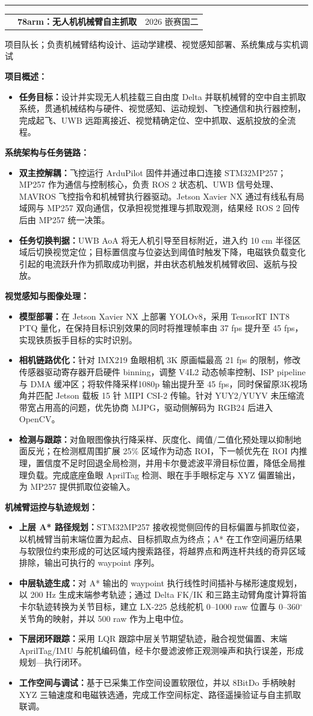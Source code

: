 \documentclass{common/resume}
\makeatletter
\newcommand{\sectionBar}[1]{%
  \vspace{0.24em}%
  \noindent\colorbox{ResumeBlue}{\makebox[2.30cm][l]{\strut\hspace{0.32em}\textcolor{white}{\bfseries\small #1}}}%
  \hspace{0.12em}\textcolor{LineGray}{\rule[0.45ex]{0.74\linewidth}{0.45pt}}%
  \vspace{0.06em}\par
}
\newcommand{\centerProjectTitle}[3]{%
  \vspace{0.12em}%
  \noindent\begin{tabularx}{\linewidth}{@{}p{3cm}>{\centering\arraybackslash\bfseries}X>{\raggedleft\arraybackslash}p{3cm}@{}}
    & #1 & {\small #2}\\[-0.10em]
  \end{tabularx}
  {\small #3}\par
  \vspace{0.00em}\par
}
\newcommand{\subHead}[1]{\vspace{0.04em}\noindent\textbf{#1：}}
\newcommand{\tightItem}[1]{\item #1}
\makeatother
\begin{document}
\sectionBar{项目经历}
\centerProjectTitle{78arm：无人机机械臂自主抓取}{2026 嵌赛国二}{项目队长；负责机械臂结构设计、运动学建模、视觉感知部署、系统集成与实机调试}
\subHead{项目概述}
\begin{itemize}
  \tightItem{\textbf{任务目标：}设计并实现无人机挂载三自由度 Delta 并联机械臂的空中自主抓取系统，贯通机械结构与硬件、视觉感知、运动规划、飞控通信和执行器控制，完成起飞、UWB 远距离接近、视觉精确定位、空中抓取、返航投放的全流程。}
\end{itemize}
\subHead{系统架构与任务链路}
\begin{itemize}
  \tightItem{\textbf{双主控解耦：}飞控运行 ArduPilot 固件并通过串口连接 STM32MP257；MP257 作为通信与控制核心，负责 ROS 2 状态机、UWB 信号处理、MAVROS 飞控指令和机械臂执行器驱动。Jetson Xavier NX 通过有线私有局域网与 MP257 双向通信，仅承担视觉推理与抓取观测，结果经 ROS 2 回传后由 MP257 统一决策。}
  \tightItem{\textbf{任务切换判据：}UWB AoA 将无人机引导至目标附近，进入约 10 cm 半径区域后切换视觉定位；目标置信度与位姿达到阈值时触发下降，电磁铁负载变化引起的电流跃升作为抓取成功判据，并由状态机触发机械臂收回、返航与投放。}
\end{itemize}
\subHead{视觉感知与图像处理}
\begin{itemize}
  \tightItem{\textbf{模型部署：}在 Jetson Xavier NX 上部署 YOLOv8，采用 TensorRT INT8 PTQ 量化，在保持目标识别效果的同时将推理帧率由 37 fps 提升至 45 fps，实现铁质扳手目标的实时识别。}
  \tightItem{\textbf{相机链路优化：}针对 IMX219 鱼眼相机 3K 原画幅最高 21 fps 的限制，修改传感器驱动寄存器开启硬件 binning，调整 V4L2 动态帧率控制、ISP pipeline 与 DMA 缓冲区；将软件降采样1080p 输出提升至 45 fps，同时保留原3K视场角并匹配 Jetson 载板 15 针 MIPI CSI-2 传输。针对 YUY2/YUYV 未压缩流带宽占用高的问题，优先协商 MJPG，驱动侧解码为 RGB24 后进入 OpenCV。}
  \tightItem{\textbf{检测与跟踪：}对鱼眼图像执行降采样、灰度化、阈值/二值化预处理以抑制地面反光；在检测框周围扩展 25\% 区域作为动态 ROI，下一帧优先在 ROI 内推理，置信度不足时回退全局检测，并用卡尔曼滤波平滑目标位置，降低全局推理负载。完成底座鱼眼 AprilTag 检测、眼在手手眼标定与 XYZ 偏置输出，为 MP257 提供抓取位姿输入。}
\end{itemize}
\subHead{机械臂运控与轨迹规划}
\begin{itemize}
  \tightItem{\textbf{上层 A* 路径规划：}STM32MP257 接收视觉侧回传的目标偏置与抓取位姿，以机械臂当前末端位置为起点、目标抓取点为终点；A* 在工作空间遍历结果与软限位约束形成的可达区域内搜索路径，将越界点和两连杆共线的奇异区域排除，输出可执行的 waypoint 序列。}
  \tightItem{\textbf{中层轨迹生成：}对 A* 输出的 waypoint 执行线性时间插补与梯形速度规划，以 200 Hz 生成末端参考轨迹；通过 Delta FK/IK 和三路主动臂角度计算将笛卡尔轨迹转换为关节目标，建立 LX-225 总线舵机 0--1000 raw 位置与 0--360$^\circ$ 关节角的映射，并以 500 raw 作为上电中位。}
  \tightItem{\textbf{下层闭环跟踪：}采用 LQR 跟踪中层关节期望轨迹，融合视觉偏置、末端 AprilTag/IMU 与舵机编码值，经卡尔曼滤波修正观测噪声和执行误差，形成规划—执行闭环。}
  \tightItem{\textbf{工作空间与调试：}基于已采集工作空间设置软限位，并以 8BitDo 手柄映射 XYZ 三轴速度和电磁铁选通，完成工作空间标定、路径遥操验证与自主抓取联调。}
\end{itemize}
\end{document}
